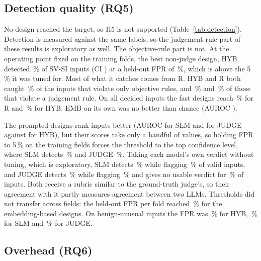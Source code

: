\documentclass[conference]{IEEEtran}
\begin{document}
\subsection{Detection quality (RQ5)}

No design reached the target, so H5 is not supported (Table~\ref{tab:detection}).\ifjudgeweak{}
Detection is measured against the same labels, so the judgement-rule part of these results is
exploratory as well. The objective-rule part is not.\fi{} At the operating point fixed on the training
folds, the best non-judge design, HYB, detected \,\% of SV-SI inputs (CI
) at a held-out FPR of \,\%, which is above the 5\,\% it was tuned for. Most
of what it catches comes from R. HYB and R both caught \,\% of the inputs that violate
only objective rules, and \,\% and \,\% of those that violate a judgement
rule. On all decided inputs the fast designs reach \,\% for R and
\,\% for HYB. EMB on its own was no better than chance (AUROC
).

The prompted designs rank inputs better (AUROC  for SLM and  for
JUDGE against  for HYB), but their scores take only a handful of values, so holding FPR
to 5\,\% on the training fields forces the threshold to the top confidence level, where SLM detects
\,\% and JUDGE \,\%. Taking each model's own verdict without
tuning, which is exploratory, SLM detects \,\% while flagging \,\% of
valid inputs, and JUDGE detects \,\% while flagging \,\% and
gives no usable verdict for \,\% of inputs. Both receive a rubric similar to the
ground-truth judge's, so their agreement with it partly measures agreement between two LLMs. Thresholds
did not transfer across fields: the held-out FPR per fold reached \,\% for the
embedding-based designs. On benign-unusual inputs the FPR was \,\% for HYB,
\,\% for SLM and \,\% for JUDGE.

\subsection{Overhead (RQ6)}
\end{document}
